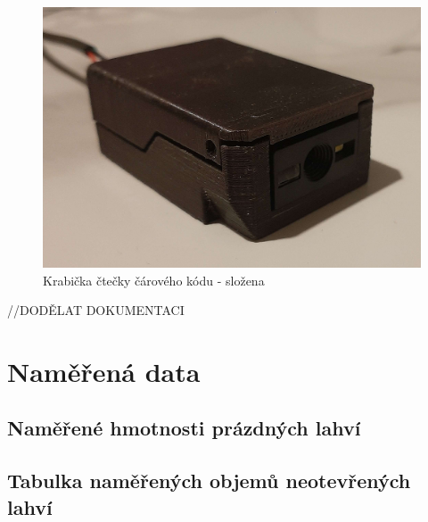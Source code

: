 \begin{figure}[H]
    \begin{center}
        \includegraphics[scale=0.15]{obrazky/krabicka slozena.jpg}
    \end{center}
    \caption{Krabička čtečky čárového kódu - složena}
    \label{Interakce mezi okny GUI}
\end{figure}


//DODĚLAT DOKUMENTACI

\chapter{Naměřená data}

\section{Naměřené hmotnosti prázdných lahví}

\section{Tabulka naměřených objemů neotevřených lahví}

